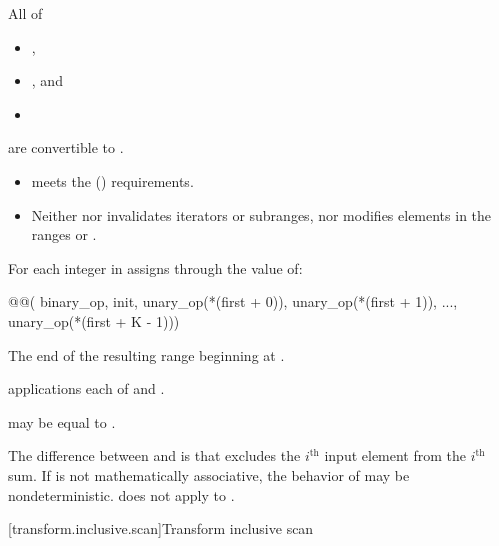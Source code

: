 \begin{itemdescr}
\pnum
\mandates
  All of
  \begin{itemize}
  \item {},
  \item {}, and
  \item {}
  \end{itemize}
  are convertible to .

\pnum
\expects
\begin{itemize}
\item
   meets the  () requirements.
\item
  Neither  nor 
  invalidates iterators or subranges, nor modifies elements in
  the ranges  or .
\end{itemize}

\pnum
\effects
For each integer  in 
assigns through  the value of:
\begin{codeblock}
@@(
    binary_op, init,
    unary_op(*(first + 0)), unary_op(*(first + 1)), ..., unary_op(*(first + K - 1)))
\end{codeblock}

\pnum
\returns
The end of the resulting range beginning at .

\pnum
\complexity
{} applications each
of  and .

\pnum
\remarks
{} may be equal to .

\pnum
\begin{note}
The difference between  and
 is that 
excludes the $i^\text{th}$ input element from the $i^\text{th}$ sum.
If  is not mathematically associative,
the behavior of  may be nondeterministic.
does not apply  to .
\end{note}
\end{itemdescr}

[transform.inclusive.scan]{Transform inclusive scan}

